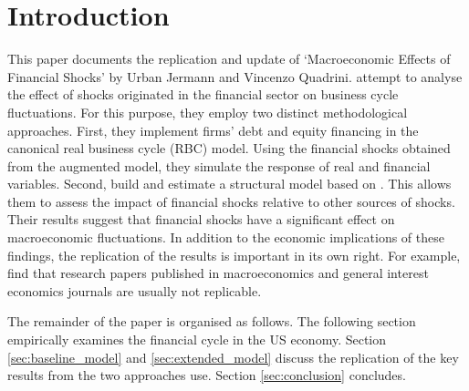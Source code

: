 \section{Introduction}
\label{sec:introduction}

This paper documents the replication and update of ‘Macroeconomic Effects of Financial Shocks’ by Urban Jermann and Vincenzo Quadrini. \citeauthor{JERMANNfinancial} attempt to analyse the effect of shocks originated in the financial sector on business cycle fluctuations. For this purpose, they employ two distinct methodological approaches. First, they implement firms' debt and equity financing in the canonical real business cycle (RBC) model. Using the financial shocks obtained from the augmented model, they simulate the response of real and financial variables. Second, \citeauthor{JERMANNfinancial} build and estimate a structural model based on \citet{SMETSshocks}. This allows them to assess the impact of financial shocks relative to other sources of shocks. Their results suggest that financial shocks have a significant effect on macroeconomic fluctuations. In addition to the economic implications of these findings, the replication of the results is important in its own right. For example, \cite{CHANGeconomics} find that research papers published in macroeconomics and general interest economics journals are usually not replicable. 

The remainder of the paper is organised as follows. The following section empirically examines the financial cycle in the US economy. Section \ref{sec:baseline_model} and \ref{sec:extended_model} discuss the replication of the key results from the two approaches \citeauthor{JERMANNfinancial} use. Section \ref{sec:conclusion} concludes.
